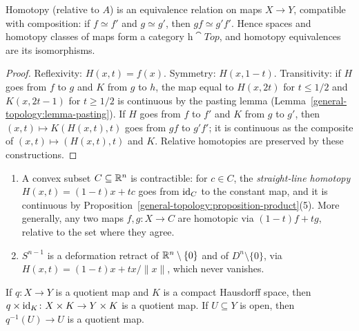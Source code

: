 \begin{lemma}\label{homotopy:lemma-homotopy-relation}
Homotopy (relative to $A$) is an equivalence relation on maps $X \to Y$, compatible with composition: if $f \simeq f'$ and $g \simeq g'$, then
$gf \simeq g'f'$. Hence spaces and homotopy classes of maps form a category $\mathrm{h}\cat{Top}$, and homotopy equivalences are its isomorphisms.
\end{lemma}

\begin{proof}
Reflexivity: $H(x, t) = f(x)$. Symmetry: $H(x, 1 - t)$. Transitivity: if $H$ goes from $f$ to $g$ and $K$ from $g$ to $h$, the map equal to $H(x, 2t)$ for
$t \leq 1/2$ and $K(x, 2t - 1)$ for $t \geq 1/2$ is continuous by the pasting lemma (Lemma~\ref{general-topology:lemma-pasting}). If $H$ goes from $f$ to
$f'$ and $K$ from $g$ to $g'$, then $(x, t) \mapsto K(H(x, t), t)$ goes from $gf$ to $g'f'$; it is continuous as the composite of
$(x, t) \mapsto (H(x, t), t)$ and $K$. Relative homotopies are preserved by these constructions.
\end{proof}

\begin{example}\label{homotopy:example-contractible}
\begin{enumerate}
\item A convex subset $C \subseteq \mathbb{R}^n$ is contractible: for $c \in C$, the \emph{straight-line homotopy} $H(x, t) = (1 - t)x + tc$ goes from $\mathrm{id}_C$ to the
constant map, and it is continuous by Proposition~\ref{general-topology:proposition-product}(5). More generally, any two maps $f, g \colon X \to C$ are
homotopic via $(1 - t)f + tg$, relative to the set where they agree.
\item $S^{n-1}$ is a deformation retract of $\mathbb{R}^n \setminus \{0\}$ and of $D^n \setminus \{0\}$, via $H(x, t) = (1 - t)x + tx/\|x\|$, which never vanishes.
\end{enumerate}
\end{example}

\begin{lemma}\label{homotopy:lemma-quotient-times-interval}
If $q \colon X \to Y$ is a quotient map and $K$ is a compact Hausdorff space, then $q \times \mathrm{id}_K \colon X \times K \to Y \times K$ is a quotient map. If
$U \subseteq Y$ is open, then $q^{-1}(U) \to U$ is a quotient map.
\end{lemma}

